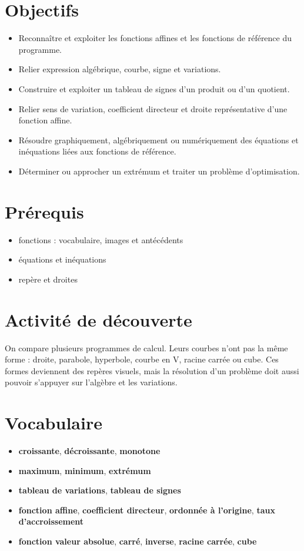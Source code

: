 \section{Objectifs}

\begin{itemize}
\item Reconnaître et exploiter les fonctions affines et les fonctions de référence du programme.
\item Relier expression algébrique, courbe, signe et variations.
\item Construire et exploiter un tableau de signes d'un produit ou d'un quotient.
\item Relier sens de variation, coefficient directeur et droite représentative d'une fonction affine.
\item Résoudre graphiquement, algébriquement ou numériquement des équations et inéquations liées aux fonctions de référence.
\item Déterminer ou approcher un extrémum et traiter un problème d'optimisation.
\end{itemize}

\section{Prérequis}

\begin{itemize}
\item fonctions : vocabulaire, images et antécédents
\item équations et inéquations
\item repère et droites
\end{itemize}

\section{Activité de découverte}

On compare plusieurs programmes de calcul. Leurs courbes n'ont pas la même forme : droite, parabole, hyperbole, courbe en V, racine carrée ou cube. Ces formes deviennent des repères visuels, mais la résolution d'un problème doit aussi pouvoir s'appuyer sur l'algèbre et les variations.

\section{Vocabulaire}

\begin{itemize}
\item \textbf{croissante}, \textbf{décroissante}, \textbf{monotone}
\item \textbf{maximum}, \textbf{minimum}, \textbf{extrémum}
\item \textbf{tableau de variations}, \textbf{tableau de signes}
\item \textbf{fonction affine}, \textbf{coefficient directeur}, \textbf{ordonnée à l'origine}, \textbf{taux d'accroissement}
\item \textbf{fonction valeur absolue}, \textbf{carré}, \textbf{inverse}, \textbf{racine carrée}, \textbf{cube}
\end{itemize}

